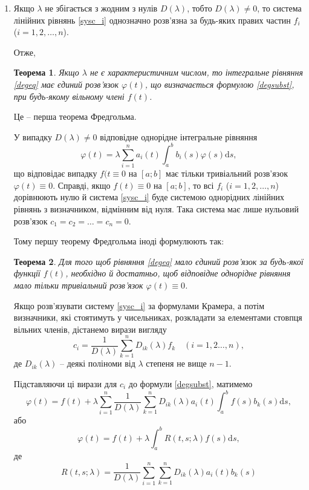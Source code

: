 \documentclass[14pt,twoside]{extreport}
\theoremstyle{mystyle}
\newtheorem{thm}{Теорема}
\numberwithin{equation}{chapter}
\begin{document}
\begin{enumerate}
 \item Якщо $\lambda$ не збігається з жодним з нулів $D(\lambda)$, тобто $D(\lambda)\neq 0$, то система лінійних рівнянь \eqref{sysc_i} однозначно розв'язна за будь-яких правих частин $f_i$ ($i = 1, 2, \ldots, n$).

Отже,
\begin{thm}
Якщо $\lambda$ не є характеристичним числом, то інтегральне рівняння \eqref{degeq} має єдиний розв'язок $\varphi(t)$, що визначається формулою \eqref{degsubst}, при будь-якому вільному члені $f(t)$.
\end{thm}
Це -- перша теорема Фредгольма.

У випадку $D(\lambda)\neq 0$ відповідне однорідне інтегральне рівняння
\begin{equation}\label{unidegeq}
 \displaystyle \varphi(t)=\lambda\sum_{i=1}^{n}a_{i}(t)\int_{a}^{b}b_{i}(s)\varphi(s)\mathrm{d}s,
\end{equation}
що відповідає випадку $f(t \equiv 0$ на $[a; b]$ має тільки тривіальний розв'язок $\varphi(t) \equiv 0$. Справді, якщо $f(t) \equiv 0$ на $[a; b]$, то всі $f_i$ ($i = 1, 2, \ldots, n$) дорівнюють нулю й система \eqref{sysc_i} буде системою однорідних лінійних рівнянь з визначником, відмінним від нуля. Така система має лише нульовий розв'язок $c_1=c_2= \ldots = c_n = 0$.

Тому першу теорему Фредгольма іноді формулюють так:
\begin{thm}
 Для того щоб рівняння \eqref{degeq} мало єдиний розв'язок за будь-якої функції $f(t)$, необхідно й достатньо, щоб відповідне однорідне рівняння мало тільки тривіальний розв'язок $\varphi(t) \equiv 0$.
\end{thm}

Якщо розв'язувати систему \eqref{sysc_i} за формулами Крамера, а потім визначники, які стоятимуть у чисельниках, розкладати за елементами стовпця вільних членів, дістанемо вирази вигляду
\[
 c_{i}=\frac{1}{D(\lambda)}\sum_{k=1}^{n}D_{ik}(\lambda)f_{k} \quad (i =1, 2 \ldots, n),
\]
де $D_{ik}(\lambda)$ -- деякі поліноми від $\lambda$ степеня не вище $n - 1$.

Підставляючи ці вирази для $c_i$ до формули \eqref{degsubst}, матимемо
\[
 \displaystyle \varphi(t)=f(t)+\lambda\sum_{i=1}^{n}\frac{1}{D(\lambda)}\sum_{k=1}^{n} D_{ik}(\lambda)a_{i}(t)\int_{a}^{b}f(s)b_{k}(s)\mathrm{d}s,
\]
або
\begin{equation}
 \displaystyle \varphi(t)=f(t)+\lambda\int_{a}^{b}R(t, s; \lambda)f(s)\mathrm{d}s,
\end{equation}
де
\begin{equation}
 R(t, s; \lambda)=\frac{1}{D(\lambda)}\sum_{i=1}^{n}\sum_{k=1}^{n}D_{ik}(\lambda) a_{i}(t) b_{k}(s)
\end{equation}


\end{enumerate}
\end{document}
